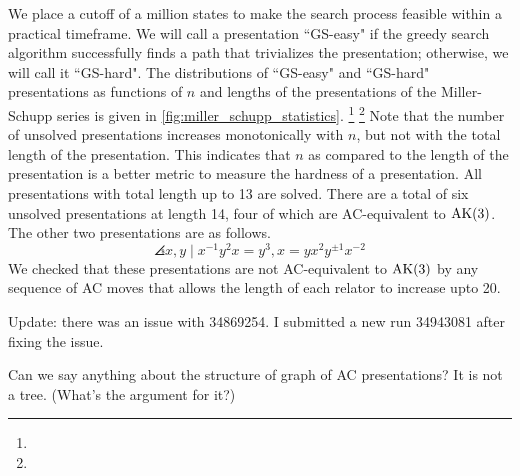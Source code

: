 We place a cutoff of a million states to make the search process feasible within a practical timeframe. We will call a presentation ``GS-easy" if the greedy search algorithm successfully finds a path that trivializes the presentation; otherwise, we will call it ``GS-hard". The distributions of ``GS-easy" and ``GS-hard" presentations as functions of $n$ and lengths of the presentations of the Miller-Schupp series is given in \autoref{fig:miller_schupp_statistics}. 
\footnote{}
\footnote{}
Note that the number of unsolved presentations increases monotonically with $n$, but not with the total length of the presentation. This indicates that $n$ as compared to the length of the presentation is a better metric to measure the hardness of a presentation. 
All presentations with total length up to 13 are solved. 
There are a total of six unsolved presentations at length 14, four of which are AC-equivalent to $\text{AK}(3)$. The other two presentations are as follows. 
\[
\angles{x, y \mid x^{-1} y^2 x = y^{3} , x = y x^2 y^{\pm 1} x^{-2}}
\]
We checked that these presentations are not AC-equivalent to $\text{AK}(3)$ by any sequence of AC moves that allows the length of each relator to increase upto 20.



Update: there was an issue with 34869254. I submitted a new run 34943081 after fixing the issue. 

Can we say anything about the structure of graph of AC presentations? It is not a tree. (What's the argument for it?) 




